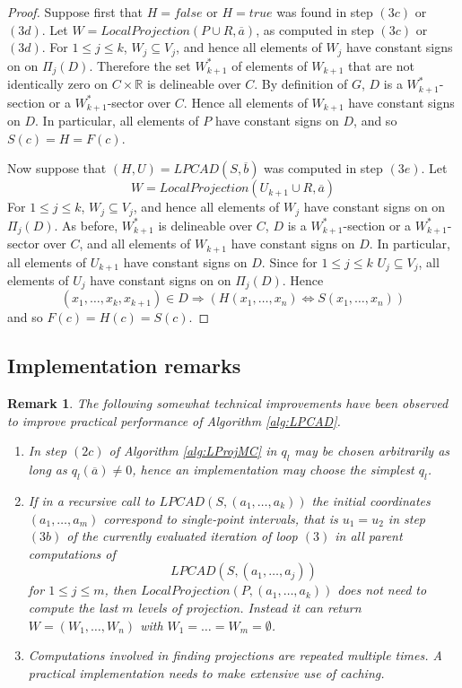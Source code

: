 \documentclass[english]{amsart}
\numberwithin{equation}{section}
\numberwithin{figure}{section}
\newtheorem{rem}[thm]{Remark}
\begin{document}
\begin{proof}
Suppose first that $H=false$ or $H=true$ was found in step $(3c)$
or $(3d)$. Let $W=LocalProjection(P\cup R,\overline{a})$, as computed
in step $(3c)$ or $(3d)$. For $1\leq j\leq k$, $W_{j}\subseteq V_{j}$,
and hence all elements of $W_{j}$ have constant signs on on $\Pi_{j}(D)$.
Therefore the set $W_{k+1}^{*}$ of elements of $W_{k+1}$ that are
not identically zero on $C\times\mathbb{R}$ is delineable over $C$.
By definition of $G$, $D$ is a $W_{k+1}^{*}$-section or a $W_{k+1}^{*}$-sector
over $C$. Hence all elements of $W_{k+1}$ have constant signs on
$D$. In particular, all elements of $P$ have constant signs on $D$,
and so $S(c)=H=F(c)$. 

Now suppose that $(H,U)=LPCAD(S,\overline{b})$ was computed in step
$(3e)$. Let \[
W=LocalProjection(U_{k+1}\cup R,\overline{a})\]
For $1\leq j\leq k$, $W_{j}\subseteq V_{j}$, and hence all elements
of $W_{j}$ have constant signs on on $\Pi_{j}(D)$. As before, $W_{k+1}^{*}$
is delineable over $C$, $D$ is a $W_{k+1}^{*}$-section or a $W_{k+1}^{*}$-sector
over $C$, and all elements of $W_{k+1}$ have constant signs on $D$.
In particular, all elements of $U_{k+1}$ have constant signs on $D$.
Since for $1\leq j\leq k$ $U_{j}\subseteq V_{j}$, all elements of
$U_{j}$ have constant signs on on $\Pi_{j}(D)$. Hence\[
(x_{1},\ldots,x_{k},x_{k+1})\in D\Rightarrow\left(H(x_{1},\ldots,x_{n})\Longleftrightarrow S(x_{1},\ldots,x_{n})\right)\]
and so $F(c)=H(c)=S(c)$.
\end{proof}

\subsection{Implementation remarks}
\begin{rem}
\label{rem:Zdim}The following somewhat technical improvements have
been observed to improve practical performance of Algorithm \ref{alg:LPCAD}.
\begin{enumerate}
\item In step $(2c)$ of Algorithm \ref{alg:LProjMC} in $q_{l}$ may be
chosen arbitrarily as long as $q_{l}(\overline{a})\neq0$, hence an
implementation may choose the simplest $q_{l}$.
\item If in a recursive call to $LPCAD(S,(a_{1},\ldots,a_{k}))$ the initial
coordinates $(a_{1},\ldots,a_{m})$ correspond to single-point intervals,
that is $u_{1}=u_{2}$ in step $(3b)$ of the currently evaluated
iteration of loop $(3)$ in all parent computations of \[
LPCAD(S,(a_{1},\ldots,a_{j}))\]
 for $1\leq j\leq m$, then $LocalProjection(P,(a_{1},\ldots,a_{k}))$
does not need to compute the last $m$ levels of projection. Instead
it can return $W=(W_{1},\ldots,W_{n})$ with $W_{1}=\ldots=W_{m}=\emptyset$.
\item Computations involved in finding projections are repeated multiple
times. A practical implementation needs to make extensive use of caching.
\end{enumerate}
\end{rem}
\end{document}
